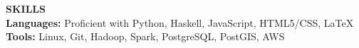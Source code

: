 \textbf{SKILLS} \\
\textbf{Languages:} Proficient with Python, Haskell, JavaScript, HTML5/CSS, \LaTeX\\
\textbf{Tools:} Linux, Git, Hadoop, Spark, PostgreSQL, PostGIS, AWS \\
\thispagestyle{empty}

